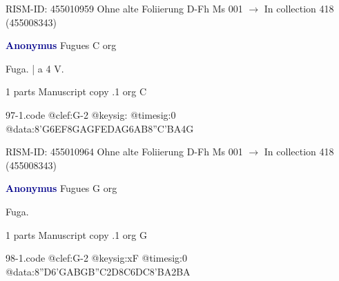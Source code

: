 \documentclass[twocolumn]{book}
\begin{document}
\newline RISM-ID: 455010959
\newline Ohne alte Foliierung
\newline D-Fh  Ms 001
\newline $\rightarrow$ In collection 418 (455008343)

\newline \par \vspace{7pt} \textcolor{darkblue}{\textbf{Anonymus  }}
\newline Fugues  C  
\newline org
\newline \begin{itshape}[f.84v, at left:] Fuga. | a 4 V.\end{itshape} 
\newline \textcolor{darkblue}{}  1 parts  
\newline Manuscript copy
.1  org  C  
\begin{filecontents*}{97-1.code}
@clef:G-2
@keysig:
@timesig:0
@data:{8'G6EF8GA}{GFED}{AG6AB8''C}{'BA}4G
\end{filecontents*}
\newline
%

\newline RISM-ID: 455010964
\newline Ohne alte Foliierung
\newline D-Fh  Ms 001
\newline $\rightarrow$ In collection 418 (455008343)

\newline \par \vspace{7pt} \textcolor{darkblue}{\textbf{Anonymus  }}
\newline Fugues  G  
\newline org
\newline \begin{itshape}[f.86r, at left:] Fuga.\end{itshape} 
\newline \textcolor{darkblue}{}  1 parts  
\newline Manuscript copy
.1  org  G  
\begin{filecontents*}{98-1.code}
@clef:G-2
@keysig:xF
@timesig:0
@data:{8''D6'GA}{BGB''C}2D{8C6DC}{8'BA}2BA
\end{filecontents*}
\newline
%
\end{document}
